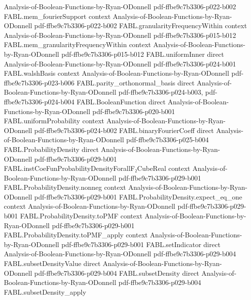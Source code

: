 \begin{theorem}
  {Analysis-of-Boolean-Functions-by-Ryan-ODonnell}
  {pdf-ffbe9c7b3306-p022-b002}
\proofstep
  {FABL.mem_fourierSupport}
  {context}
  {Analysis-of-Boolean-Functions-by-Ryan-ODonnell}
  {pdf-ffbe9c7b3306-p022-b002}
\proofstep
  {FABL.granularityFrequencyWithin}
  {context}
  {Analysis-of-Boolean-Functions-by-Ryan-ODonnell}
  {pdf-ffbe9c7b3306-p015-b012}
\proofstep
  {FABL.mem_granularityFrequencyWithin}
  {context}
  {Analysis-of-Boolean-Functions-by-Ryan-ODonnell}
  {pdf-ffbe9c7b3306-p015-b012}
\proofstep
  {FABL.uniformInner}
  {direct}
  {Analysis-of-Boolean-Functions-by-Ryan-ODonnell}
  {pdf-ffbe9c7b3306-p024-b001}
\proofstep
  {FABL.walshBasis}
  {context}
  {Analysis-of-Boolean-Functions-by-Ryan-ODonnell}
  {pdf-ffbe9c7b3306-p023-b006}
\proofstep
  {FABL.parity_orthonormal_basis}
  {direct}
  {Analysis-of-Boolean-Functions-by-Ryan-ODonnell}
  {pdf-ffbe9c7b3306-p024-b003,
    pdf-ffbe9c7b3306-p024-b004}
\proofstep
  {FABL.BooleanFunction}
  {direct}
  {Analysis-of-Boolean-Functions-by-Ryan-ODonnell}
  {pdf-ffbe9c7b3306-p020-b001}
\proofstep
  {FABL.uniformProbability}
  {context}
  {Analysis-of-Boolean-Functions-by-Ryan-ODonnell}
  {pdf-ffbe9c7b3306-p024-b002}
\proofstep
  {FABL.binaryFourierCoeff}
  {direct}
  {Analysis-of-Boolean-Functions-by-Ryan-ODonnell}
  {pdf-ffbe9c7b3306-p025-b004}
\proofstep
  {FABL.ProbabilityDensity}
  {direct}
  {Analysis-of-Boolean-Functions-by-Ryan-ODonnell}
  {pdf-ffbe9c7b3306-p029-b001}
\proofstep
  {FABL.instCoeFunProbabilityDensityForallF₂CubeReal}
  {context}
  {Analysis-of-Boolean-Functions-by-Ryan-ODonnell}
  {pdf-ffbe9c7b3306-p029-b001}
\proofstep
  {FABL.ProbabilityDensity.nonneg}
  {context}
  {Analysis-of-Boolean-Functions-by-Ryan-ODonnell}
  {pdf-ffbe9c7b3306-p029-b001}
\proofstep
  {FABL.ProbabilityDensity.expect_eq_one}
  {context}
  {Analysis-of-Boolean-Functions-by-Ryan-ODonnell}
  {pdf-ffbe9c7b3306-p029-b001}
\proofstep
  {FABL.ProbabilityDensity.toPMF}
  {context}
  {Analysis-of-Boolean-Functions-by-Ryan-ODonnell}
  {pdf-ffbe9c7b3306-p029-b001}
\proofstep
  {FABL.ProbabilityDensity.toPMF_apply}
  {context}
  {Analysis-of-Boolean-Functions-by-Ryan-ODonnell}
  {pdf-ffbe9c7b3306-p029-b001}
\proofstep
  {FABL.setIndicator}
  {direct}
  {Analysis-of-Boolean-Functions-by-Ryan-ODonnell}
  {pdf-ffbe9c7b3306-p029-b004}
\proofstep
  {FABL.subsetDensityValue}
  {direct}
  {Analysis-of-Boolean-Functions-by-Ryan-ODonnell}
  {pdf-ffbe9c7b3306-p029-b004}
\proofstep
  {FABL.subsetDensity}
  {direct}
  {Analysis-of-Boolean-Functions-by-Ryan-ODonnell}
  {pdf-ffbe9c7b3306-p029-b004}
\proofstep
  {FABL.subsetDensity_apply}

\end{theorem}
